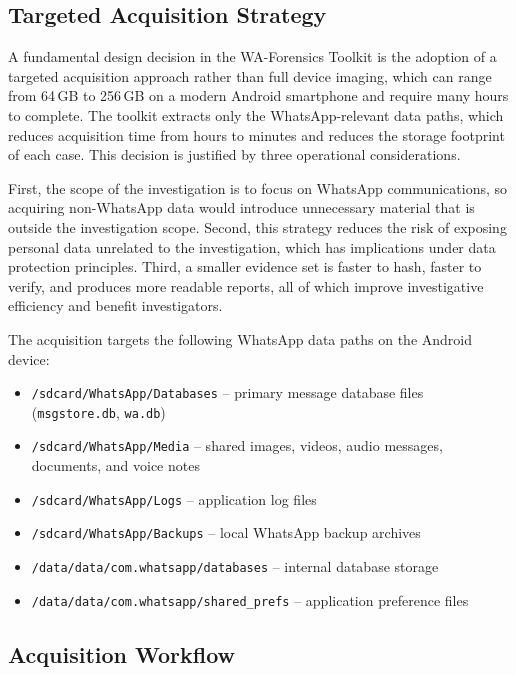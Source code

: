 \documentclass[12pt,a4paper]{report}
\begin{document}
\subsection{Targeted Acquisition Strategy}

A fundamental design decision in the WA-Forensics Toolkit is the adoption of a targeted acquisition approach rather than full device imaging, which can range from 64\,GB to 256\,GB on a modern Android smartphone and require many hours to complete. The toolkit extracts only the WhatsApp-relevant data paths, which reduces acquisition time from hours to minutes and reduces the storage footprint of each case. This decision is justified by three operational considerations.

First, the scope of the investigation is to focus on WhatsApp communications, so acquiring non-WhatsApp data would introduce unnecessary material that is outside the investigation scope. Second, this strategy reduces the risk of exposing personal data unrelated to the investigation, which has implications under data protection principles. Third, a smaller evidence set is faster to hash, faster to verify, and produces more readable reports, all of which improve investigative efficiency and benefit investigators.

The acquisition targets the following WhatsApp data paths on the Android device:
\begin{itemize}
    \item \texttt{/sdcard/WhatsApp/Databases} -- primary message database files (\texttt{msgstore.db}, \texttt{wa.db})
    \item \texttt{/sdcard/WhatsApp/Media} -- shared images, videos, audio messages, documents, and voice notes
    \item \texttt{/sdcard/WhatsApp/Logs} -- application log files
    \item \texttt{/sdcard/WhatsApp/Backups} -- local WhatsApp backup archives
    \item \texttt{/data/data/com.whatsapp/databases} -- internal database storage
    \item \texttt{/data/data/com.whatsapp/shared\_prefs} -- application preference files
\end{itemize}

\subsection{Acquisition Workflow}
\end{document}
